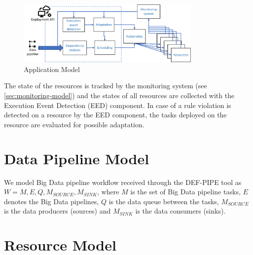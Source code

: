 
    \begin{figure}
        \centering
        \includegraphics[width=0.8\textwidth]{pdf/data_cloud_arch.pdf}
        \caption{Application Model}
        \label{fig:application-model}
    \end{figure}
    \noindent
    The state of the resources is tracked by the monitoring system (see \ref{sec:monitoring-model}) and the states of all resources are collected with the Execution Event Detection (EED) component. In case of a rule violation is detected on a resource by the EED component, the tasks deployed on the resource are evaluated for possible adaptation.

    \section{Data Pipeline Model}
    \label{sec:data-pipeline-model}

        We model Big Data pipeline workflow received through the DEF-PIPE tool as $W = M, E, Q, M_{SOURCE}, M_{SINK}$, where $M$ is the set of Big Data pipeline tasks, $E$ denotes the Big Data pipelines, $Q$ is the data queue between the tasks, $M_{SOURCE}$ is the data producers (sources) and $M_{SINK}$ is the data consumers (sinks).



    \section{Resource Model}
    \label{sec:resource-model}

